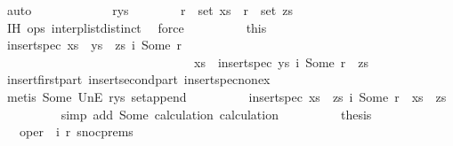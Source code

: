 \begin{isabellebody}
\ auto\isanewline
\ \ \ \ \isamarkupfalse%
\isanewline
\ \ \ \ \ \ \isamarkupfalse%
\ r{\isacharunderscore}ys\isanewline
\ \ \ \ \ \ \isamarkupfalse%
\ {\isachardoublequoteopen}r\ {\isasymnotin}\ set\ xs{\isachardoublequoteclose}\ \ {\isachardoublequoteopen}r\ {\isasymnotin}\ set\ zs{\isachardoublequoteclose}\isanewline
\ \ \ \ \ \ \ \ \isamarkupfalse%
\ IH{}\ ops{}\ interp{\isacharunderscore}list{\isacharunderscore}distinct\ \isamarkupfalse%
\ force{\isacharplus}\isanewline
\ \ \ \ \ \ \isamarkupfalse%
\ \isamarkupfalse%
\ this\ \isamarkupfalse%
\ {\isachardoublequoteopen}insert{\isacharunderscore}spec\ {\isacharparenleft}xs\ {\isacharat}\ ys\ {\isacharat}\ zs{\isacharparenright}\ {\isacharparenleft}i{}{\isacharcomma}\ Some\ r{\isacharparenright}\ {\isacharequal}\isanewline
\ \ \ \ \ \ \ \ \ \ \ \ \ \ \ \ \ \ \ \ \ \ \ \ \ \ \ \ \ \ \ xs\ {\isacharat}\ {\isacharparenleft}insert{\isacharunderscore}spec\ ys\ {\isacharparenleft}i{}{\isacharcomma}\ Some\ r{\isacharparenright}{\isacharparenright}\ {\isacharat}\ zs{\isachardoublequoteclose}\isanewline
\ \ \ \ \ \ \ \ \isamarkupfalse%
\ insert{\isacharunderscore}first{\isacharunderscore}part\ insert{\isacharunderscore}second{\isacharunderscore}part\ insert{\isacharunderscore}spec{\isacharunderscore}nonex\isanewline
\ \ \ \ \ \ \ \ \isamarkupfalse%
\ {\isacharparenleft}metis\ Some\ UnE\ r{\isacharunderscore}ys\ set{\isacharunderscore}append{\isacharparenright}\isanewline
\ \ \ \ \ \ \isamarkupfalse%
\ \isamarkupfalse%
\ {\isachardoublequoteopen}insert{\isacharunderscore}spec\ {\isacharparenleft}xs\ {\isacharat}\ zs{\isacharparenright}\ {\isacharparenleft}i{}{\isacharcomma}\ Some\ r{\isacharparenright}\ {\isacharequal}\ xs\ {\isacharat}\ zs{\isachardoublequoteclose}\isanewline
\ \ \ \ \ \ \ \ \isamarkupfalse%
\ {\isacharparenleft}simp\ add{\isacharcolon}\ Some\ calculation{\isacharparenleft}{}{\isacharparenright}\ calculation{\isacharparenleft}{}{\isacharparenright}{\isacharparenright}\isanewline
\ \ \ \ \ \ \isamarkupfalse%
\ \isamarkupfalse%
\ {\isacharquery}thesis\isanewline
\ \ \ \ \ \ \ \ \isamarkupfalse%
\ {}\ {}\ {\isacartoucheopen}oper\ {\isacharequal}\ {\isacharparenleft}i{}{\isacharcomma}\ r{}{\isacharparenright}{\isacartoucheclose}\ snoc{\isachardot}prems\ \isamarkupfalse%

\end{isabellebody}
